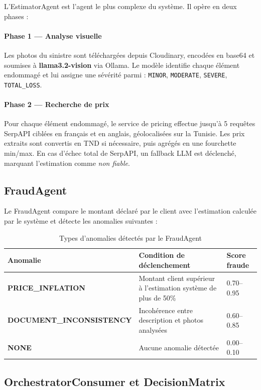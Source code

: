 L'EstimatorAgent est l'agent le plus complexe du système. Il opère en deux phases :

\paragraph{Phase 1 — Analyse visuelle}
Les photos du sinistre sont téléchargées depuis Cloudinary, encodées en base64
et soumises à \textbf{llama3.2-vision} via Ollama. Le modèle identifie chaque
élément endommagé et lui assigne une sévérité parmi :
\texttt{MINOR}, \texttt{MODERATE}, \texttt{SEVERE}, \texttt{TOTAL\_LOSS}.

\paragraph{Phase 2 — Recherche de prix}
Pour chaque élément endommagé, le service de pricing effectue jusqu'à 5 requêtes
SerpAPI ciblées en français et en anglais, géolocalisées sur la Tunisie.
Les prix extraits sont convertis en TND si nécessaire, puis agrégés en une fourchette
min/max. En cas d'échec total de SerpAPI, un fallback LLM est déclenché,
marquant l'estimation comme \textit{non fiable}.

\subsection{FraudAgent}

Le FraudAgent compare le montant déclaré par le client avec l'estimation calculée
par le système et détecte les anomalies suivantes :

\begin{table}[H]
\centering
\caption{Types d'anomalies détectés par le FraudAgent}
\begin{tabularx}{\textwidth}{>{\bfseries}lXl}
\toprule
Anomalie               & Condition de déclenchement & Score fraude \\
\midrule
PRICE\_INFLATION       & Montant client supérieur à l'estimation système de plus de 50\% & 0.70--0.95 \\
DOCUMENT\_INCONSISTENCY & Incohérence entre description et photos analysées & 0.60--0.85 \\
NONE                   & Aucune anomalie détectée & 0.00--0.10 \\
\bottomrule
\end{tabularx}
\label{tab:fraud_types}
\end{table}

\subsection{OrchestratorConsumer et DecisionMatrix}

